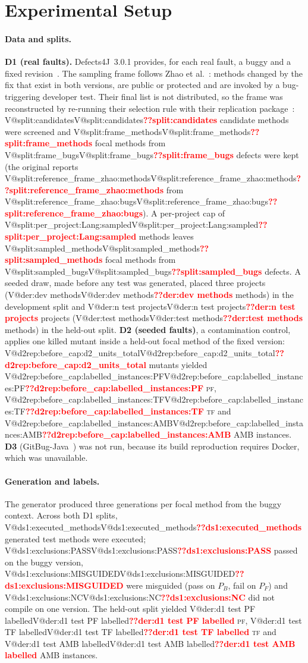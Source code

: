 \documentclass[pdflatex,iicol,sn-mathphys-num]{sn-jnl}
\makeatletter
\newcommand{\V}[1]{\ifcsname V@#1\endcsname\csname V@#1\endcsname\else\textbf{\textcolor{red}{??#1}}\fi}
\newcommand{\PF}{\textsc{pf}}
\newcommand{\TF}{\textsc{tf}}
\makeatother
\begin{document}
\section{Experimental Setup}\label{sec:setup}

\paragraph{Data and splits.} \textbf{D1 (real faults).} Defects4J~3.0.1 provides, for each real fault, a buggy and a fixed revision~\cite{just2014defects4j,defects4j301}. The sampling frame follows Zhao et al.~\cite{zhao2026misguidance}: methods changed by the fix that exist in both versions, are public or protected and are invoked by a bug-triggering developer test. Their final list is not distributed, so the frame was reconstructed by re-running their selection rule with their replication package~\cite{zhao2026replication}: \V{split:candidates} candidate methods were screened and \V{split:frame_methods} focal methods from \V{split:frame_bugs} defects were kept (the original reports \V{split:reference_frame_zhao:methods} from \V{split:reference_frame_zhao:bugs}). A per-project cap of \V{split:per_project:Lang:sampled} methods leaves \V{split:sampled_methods} focal methods from \V{split:sampled_bugs} defects. A seeded draw, made before any test was generated, placed three projects (\V{der:dev methods} methods) in the development split and \V{der:n test projects} projects (\V{der:test methods} methods) in the held-out split. \textbf{D2 (seeded faults)}, a contamination control, applies one killed mutant inside a held-out focal method of the fixed version: \V{d2rep:before_cap:d2_units_total} mutants yielded \V{d2rep:before_cap:labelled_instances:PF} \PF, \V{d2rep:before_cap:labelled_instances:TF} \TF{} and \V{d2rep:before_cap:labelled_instances:AMB} AMB instances. \textbf{D3} (GitBug-Java~\cite{silva2024gitbug}) was not run, because its build reproduction requires Docker, which was unavailable.

\paragraph{Generation and labels.} The generator produced three generations per focal method from the buggy context. Across both D1 splits, \V{ds1:executed_methods} generated test methods were executed; \V{ds1:exclusions:PASS} passed on the buggy version, \V{ds1:exclusions:MISGUIDED} were misguided (pass on $P_B$, fail on $P_F$) and \V{ds1:exclusions:NC} did not compile on one version. The held-out split yielded \V{der:d1 test PF labelled} \PF, \V{der:d1 test TF labelled} \TF{} and \V{der:d1 test AMB labelled} AMB instances.
\end{document}
